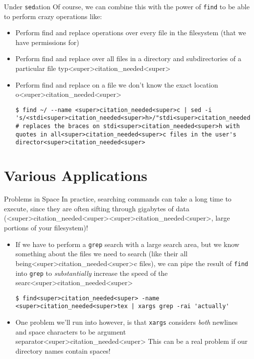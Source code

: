 \documentclass[11pt]{beamer}
\begin{document}
\begin{frame}[fragile=singleslide]{Under \texttt{sed}ation}
Of course, we can combine this with the power of \texttt{find} to be able to perform crazy operations like:
\begin{itemize}
\item Perform find and replace operations over every file in the filesystem (that we have permissions for)
\item Perform find and replace over all files in a directory and subdirectories of a particular file typ<super>citation_needed<super>
\item Perform find and replace on a file we don't know the exact location o<super>citation_needed<super>
\begin{lstlisting}[style=terminal]
$ find ~/ --name <super>citation_needed<super>c | sed -i 's/<stdi<super>citation_needed<super>h>/"stdi<super>citation_needed<super>h"/g' 
# replaces the braces on stdi<super>citation_needed<super>h with quotes in all<super>citation_needed<super>c files in the user's director<super>citation_needed<super>  
\end{lstlisting}

\end{itemize}
\end{frame}

\section[Applications]{Various Applications}
\begin{frame}[fragile=singleslide]{Problems in Space}
In practice, searching commands can take a long time to execute, since they are often sifting through gigabytes of data (<super>citation_needed<super><super>citation_needed<super>, large portions of your filesystem)!
\begin{itemize}
\item If we have to perform a \texttt{grep} search with a large search area, but we know something about the files we need to search (like their all being<super>citation_needed<super>c files), we can pipe the result of \texttt{find} into \texttt{grep} to \emph{substantially} increase the speed of the searc<super>citation_needed<super>  
\begin{lstlisting}[style=terminal]
$ find<super>citation_needed<super> -name <super>citation_needed<super>tex | xargs grep -rai 'actually'
\end{lstlisting}
\item One problem we'll run into however, is that \texttt{xargs} considers 
\emph{both} newlines and space characters to be argument separator<super>citation_needed<super>  This can be a real problem if our directory names contain spaces! 
\end{itemize}  
\end{frame}
\end{document}
